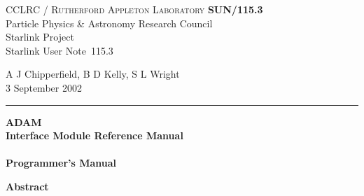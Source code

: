 \documentclass[twoside,11pt]{article}
\newcommand{\stardoccategory}  {Starlink User Note}
\newcommand{\stardocinitials}  {SUN}
\newcommand{\stardocnumber}    {115.3}
\newcommand{\stardocauthors}   {A J Chipperfield, B D Kelly, S L Wright}
\newcommand{\stardocdate}      {3 September 2002}
\newcommand{\stardoctitle}     {ADAM\\[2ex]
                                Interface Module Reference Manual}
\newcommand{\stardocversion}   {}
\newcommand{\stardocmanual}    {Programmer's Manual}
\newcommand{\stardocname}{\stardocinitials /\stardocnumber}
\newenvironment{latexonly}{}{}
\renewcommand{\_}{\texttt{\symbol{95}}}
\begin{document}
\thispagestyle{empty}

\begin{latexonly}
   CCLRC / \textsc{Rutherford Appleton Laboratory} \hfill \textbf{\stardocname}\\
   {\large Particle Physics \& Astronomy Research Council}\\
   {\large Starlink Project\\}
   {\large \stardoccategory\ \stardocnumber}
   \begin{flushright}
   \stardocauthors\\
   \stardocdate
   \end{flushright}
   \vspace{-4mm}
   \rule{\textwidth}{0.5mm}
   \vspace{5mm}
   \begin{center}
   {\Huge\textbf{\stardoctitle \\ [2.5ex]}}
   {\LARGE\textbf{\stardocversion \\ [4ex]}}
   {\Huge\textbf{\stardocmanual}}
   \end{center}
   \vspace{5mm}


   \vspace{10mm}
   \begin{center}
      {\Large\textbf{Abstract}}
   \end{center}
\end{latexonly}
\end{document}
